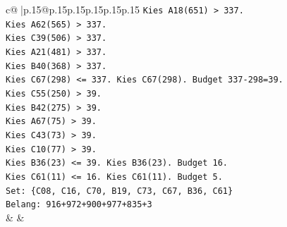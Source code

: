 \documentclass{article}
\begin{document}
{\begin{supertabular}{c@{$\;$}|p{.15\linewidth}@{}p{.15\linewidth}p{.15\linewidth}p{.15\linewidth}p{.15\linewidth}p{.15\linewidth}}
{{{\texttt{Kies A18(651) > 337.} \\
\texttt{Kies A62(565) > 337.} \\
\texttt{Kies C39(506) > 337.} \\
\texttt{Kies A21(481) > 337.} \\
\texttt{Kies B40(368) > 337.} \\
\texttt{Kies C67(298) <= 337. Kies C67(298). Budget 337{-}298=39.} \\
\texttt{Kies C55(250) > 39.} \\
\texttt{Kies B42(275) > 39.} \\
\texttt{Kies A67(75) > 39.} \\
\texttt{Kies C43(73) > 39.} \\
\texttt{Kies C10(77) > 39.} \\
\texttt{Kies B36(23) <= 39. Kies B36(23). Budget 16.} \\
\texttt{Kies C61(11) <= 16. Kies C61(11). Budget 5.} \\
\texttt{Set: \{C08, C16, C70, B19, C73, C67, B36, C61\}} \\
\texttt{Belang: 916+972+900+977+835+3} \\
            }
        }
    }
    & & \\ \\


\end{supertabular}}
\end{document}
